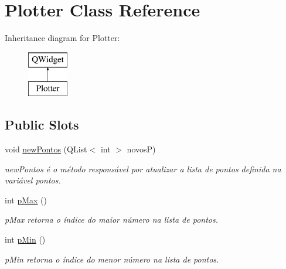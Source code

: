 \hypertarget{class_plotter}{}\section{Plotter Class Reference}
\label{class_plotter}
Inheritance diagram for Plotter\+:\begin{figure}[H]
\begin{center}
\leavevmode
\includegraphics[height=2.000000cm]{class_plotter}
\end{center}
\end{figure}
\subsection*{Public Slots}
\begin{DoxyCompactItemize}
\item 
\mbox{\label{class_plotter_a836f9d98817e7e4226fe41fbe4ea2a87}} 
void \mbox{\hyperlink{class_plotter_a836f9d98817e7e4226fe41fbe4ea2a87}{new\+Pontos}} (Q\+List$<$ int $>$ novosP)
\begin{DoxyCompactList}\small\item\em new\+Pontos é o método responsável por atualizar a lista de pontos definida na variável pontos. \end{DoxyCompactList}\item 
\mbox{\label{class_plotter_a3dcb7c8bf30d03f0c0c8e2be14b83f58}} 
int \mbox{\hyperlink{class_plotter_a3dcb7c8bf30d03f0c0c8e2be14b83f58}{p\+Max}} ()
\begin{DoxyCompactList}\small\item\em p\+Max retorna o índice do maior número na lista de pontos. \end{DoxyCompactList}\item 
\mbox{\label{class_plotter_a6196ac5880e4cdb9c2b2145678927f73}} 
int \mbox{\hyperlink{class_plotter_a6196ac5880e4cdb9c2b2145678927f73}{p\+Min}} ()
\begin{DoxyCompactList}\small\item\em p\+Min retorna o índice do menor número na lista de pontos. \end{DoxyCompactList}\end{DoxyCompactItemize}
